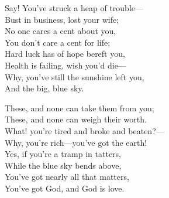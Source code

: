 

\begin{poemblock}
Say! You've struck a heap of trouble—\\
\idt  Bust in business, lost your wife;\\
No one cares a cent about you,\\
\idt You don't care a cent for life;\\
Hard luck has of hope bereft you,\\
\idt Health is failing, wish you'd die—\\
Why, you've still the sunshine left you,\\
\idt And the big, blue sky.


These, and none can take them from you;\\
\idt These, and none can weigh their worth.\\
What! you're tired and broke and beaten?—\\
\idt Why, you're rich—you've got the earth!\\
Yes, if you're a tramp in tatters,\\
\idt While the blue sky bends above,\\
You've got nearly all that matters,\\
\idt You've got God, and God is love.

\end{poemblock}
